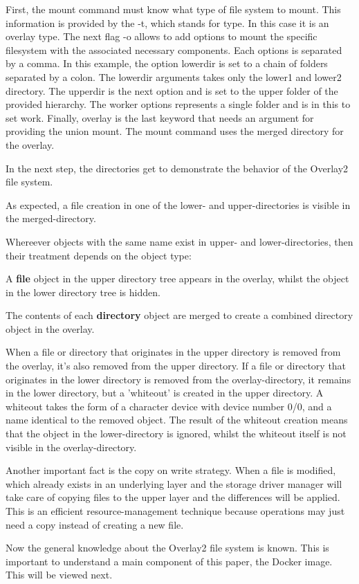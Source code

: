 First, the mount command must know what type of file system to mount. This information is provided by the -t, which stands for type. In this case it is an overlay type. The next flag -o allows to add options to mount the specific filesystem with the associated necessary components. Each options is separated by a comma. In this example, the option lowerdir is set to a chain of folders separated by a colon. The lowerdir arguments takes only the lower1 and lower2 directory. The upperdir is the next option and is set to the upper folder of the provided hierarchy. The worker options represents a single folder and is in this to set work. Finally, overlay is the last keyword that needs an argument for providing the union mount. The mount command uses the merged directory for the overlay.

In the next step, the directories get to demonstrate the behavior of the Overlay2 file system.



As expected, a file creation in one of the lower- and upper-directories is visible in the merged-directory.

Whereever objects with the same name exist in upper- and lower-directories, then their treatment depends on the object type:

A \textbf{file} object in the upper directory tree appears in the overlay, whilst the object in the lower directory tree is hidden.

The contents of each \textbf{directory}  object are merged to create a combined directory object in the overlay.

When a file or directory that originates in the upper directory is removed from the overlay, it's also removed from the upper directory. If a file or directory that originates in the lower directory is removed from the overlay-directory, it remains in the lower directory, but a 'whiteout' is created in the upper directory. A whiteout takes the form of a character device with device number 0/0, and a name identical to the removed object. The result of the whiteout creation means that the object in the lower-directory is ignored, whilst the whiteout itself is not visible in the overlay-directory. 

Another important fact is the copy on write strategy. When a file is modified, which already exists in an underlying layer and the storage driver manager will take care of copying files to the upper layer and the differences will be applied. This is an efficient resource-management technique because operations may just need a copy instead of creating a new file.
	
Now the general knowledge about the Overlay2 file system is known. This is important to understand a main component of this paper, the Docker image. This will be viewed next.